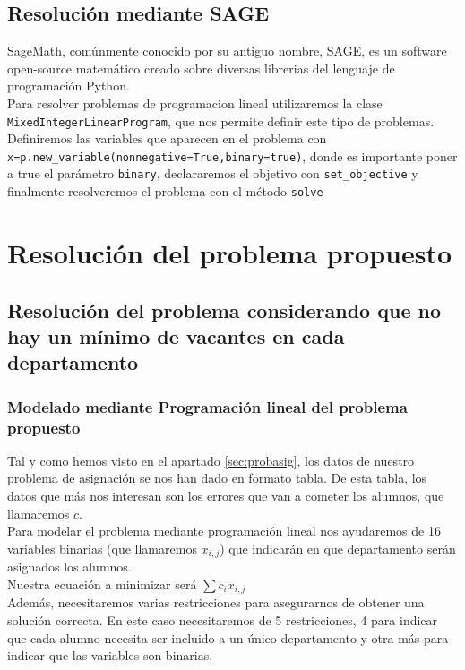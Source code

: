 \documentclass[11pt]{article}
\begin{document}
\subsection{Resolución mediante SAGE}
SageMath\cite{sageweb}, comúnmente conocido por su antiguo nombre, SAGE, es un software open-source matemático creado sobre diversas librerias del lenguaje de programación Python\cite{pythonweb}.\\

Para resolver problemas de programacion lineal utilizaremos la clase \texttt{MixedIntegerLinearProgram}, que nos permite definir este tipo de problemas.\\
Definiremos las variables que aparecen en el problema con \texttt{x=p.new\_variable(nonnegative=True,binary=true)}, donde es importante poner a true el parámetro \texttt{binary}, declararemos el objetivo con \texttt{set\_objective} y finalmente resolveremos el problema con el método \texttt{solve}




\section{Resolución del problema propuesto}
\subsection{Resolución del problema considerando que no hay un mínimo de vacantes en cada departamento}

\subsubsection{Modelado mediante Programación lineal del problema propuesto}\label{ref:proglineal}
Tal y como hemos visto en el apartado \ref{sec:probasig}, los datos de nuestro problema de asignación se nos han dado en formato tabla. De esta tabla, los datos que más nos interesan son los errores que van a cometer los alumnos, que llamaremos $c$.\\
Para modelar el problema mediante programación lineal nos ayudaremos de 16 variables binarias (que llamaremos $x_{i,j}$) que indicarán en que departamento serán asignados los alumnos.\\

Nuestra ecuación a minimizar será $\sum{c_i x_{i,j}}$\\
Además, necesitaremos varias restricciones para asegurarnos de obtener una solución correcta. En este caso necesitaremos de 5 restricciones, 4 para indicar que cada alumno necesita ser incluido a un único departamento y otra más para indicar que las variables son binarias.\\
\end{document}

